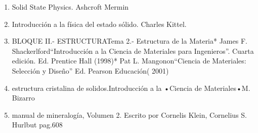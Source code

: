 \documentclass[12pt,a4paper]{article}
\begin{document}
\begin{enumerate}
    \item Solid State Physics. Ashcroft Mermin\\

    \item Introducción a la física del estado sólido.  Charles Kittel.\\

    \item BLOQUE II.- ESTRUCTURATema 2.- Estructura de la Materia* James F. Shackerlford“Introducción   a   la   Ciencia   de   Materiales   para   Ingenieros”. Cuarta edición. Ed. Prentice Hall (1998)* Pat L. Mangonon“Ciencia de Materiales: Selección y Diseño” Ed. Pearson Educación( 2001)\\

    \item estructura cristalina de solidos.Introducción a la •Ciencia de Materiales•M. Bizarro\\

    \item manual de mineralogía, Volumen 2. Escrito por Cornelis Klein, Cornelius S. Hurlbut pag.608\\

\end{enumerate}
\end{document}
